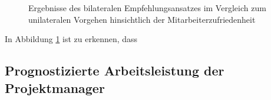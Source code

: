 \begin{figure}[h]
	\caption{Ergebnisse des bilateralen Empfehlungsansatzes im Vergleich zum unilateralen Vorgehen hinsichtlich der Mitarbeiterzufriedenheit}
	\label{fig:ergebnisse:analyse:abb7}
\end{figure}

In Abbildung \ref{fig:ergebnisse:analyse:abb7} ist zu erkennen, dass 

\subsection{Prognostizierte Arbeitsleistung der Projektmanager}
\label{ch:ergebnisse:umfrageMitarbeiter:arbeitsleistung}
